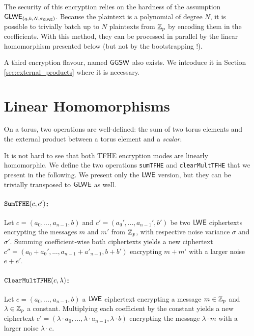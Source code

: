 The security of this encryption relies on the hardness of the assumption $\textsf{GLWE}_{(q, k, N, \sigma_{\textsf{GLWE}})}$. Because the plaintext is a polynomial of degree $N$, it is possible to trivially batch up to $N$ plaintexts from $\mathbb{Z}_p$ by encoding them in the coefficients. With this method, they can be processed in parallel by the linear homomorphism presented below (but not by the bootstrapping !).
\medskip

A third encryption flavour, named $\textsf{GGSW}$ also exists. We introduce it in Section \ref{sec:external_products} where it is necessary.


\section{Linear Homomorphisms}

On a torus, two operations are well-defined: the sum of two torus elements and the external product between a torus element and a \textit{scalar}.

It is not hard to see that both TFHE encryption modes are linearly homomorphic. We define the two operations \texttt{sumTFHE} and \texttt{clearMultTFHE} that we present in the following. We present only the $\textsf{LWE}$ version, but they can be trivially transposed to $\textsf{GLWE}$ as well.


\paragraph{$\texttt{SumTFHE}(c, c')$:} Let $c = (a_0, \dots, a_{n-1}, b)$ and $c' = (a_0', \dots, a_{n-1}', b')$ be two $\textsf{LWE}$ ciphertexts encrypting the messages $m$ and $m'$ from $\mathbb{Z}_p$, with respective noise variance $\sigma$ and $\sigma'$. Summing coefficient-wise both ciphertexts yields a new ciphertext $c'' = (a_0 + a_0', \dots, a_{n-1} + a'_{n-1}, b + b')$ encrypting $m + m'$ with a larger noise $e + e'$.


\paragraph{$\texttt{ClearMultTFHE}(c, \lambda)$:} Let $c = (a_0, \dots, a_{n-1}, b)$ a $\textsf{LWE}$ ciphertext encrypting a message $m \in \mathbb{Z}_p$ and $\lambda \in \mathbb{Z}_p$ a constant. Multiplying each coefficient by the constant yields a new ciphertext $c' = (\lambda \cdot a_0, \dots, \lambda \cdot a_{n-1}, \lambda \cdot b)$ encrypting the message $\lambda \cdot m$ with a larger noise $\lambda \cdot e$.



